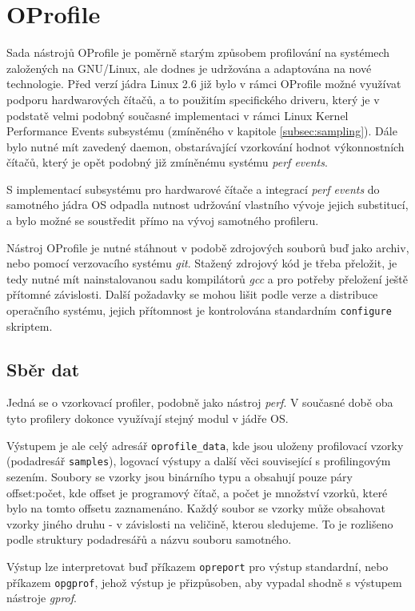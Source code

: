 \documentclass[czech,BP]{thesiskiv}
\begin{document}
\section{OProfile}

Sada nástrojů OProfile je poměrně starým způsobem profilování na systémech založených na GNU/Linux, ale dodnes je udržována a adaptována na nové technologie. Před verzí jádra Linux 2.6 již bylo v rámci OProfile možné využívat podporu hardwarových čítačů, a to použitím specifického driveru, který je v podstatě velmi podobný současné implementaci v rámci Linux Kernel Performance Events subsystému (zmíněného v kapitole \ref{subsec:sampling}). Dále bylo nutné mít zavedený daemon, obstarávající vzorkování hodnot výkonnostních čítačů, který je opět podobný již zmíněnému systému \emph{perf events}.

S implementací subsystému pro hardwarové čítače a integrací \emph{perf events} do samotného jádra OS odpadla nutnost udržování vlastního vývoje jejich substitucí, a bylo možné se soustředit přímo na vývoj samotného profileru.

Nástroj OProfile je nutné stáhnout v podobě zdrojových souborů buď jako archiv, nebo pomocí verzovacího systému \emph{git}. Stažený zdrojový kód je třeba přeložit, je tedy nutné mít nainstalovanou sadu kompilátorů \emph{gcc} a pro potřeby přeložení ještě přítomné závislosti. Další požadavky se mohou lišit podle verze a distribuce operačního systému, jejich přítomnost je kontrolována standardním \texttt{configure} skriptem.

\subsection*{Sběr dat}

Jedná se o vzorkovací profiler, podobně jako nástroj \emph{perf}. V současné době oba tyto profilery dokonce využívají stejný modul v jádře OS.

Výstupem je ale celý adresář \texttt{oprofile\_data}, kde jsou uloženy profilovací vzorky (podadresář \texttt{samples}), logovací výstupy a další věci související s profilingovým sezením. Soubory se vzorky jsou binárního typu a obsahují pouze páry offset:počet, kde offset je programový čítač, a počet je množství vzorků, které bylo na tomto offsetu zaznamenáno. Každý soubor se vzorky může obsahovat vzorky jiného druhu - v závislosti na veličině, kterou sledujeme. To je rozlišeno podle struktury podadresářů a názvu souboru samotného.

Výstup lze interpretovat buď příkazem \texttt{opreport} pro výstup standardní, nebo příkazem \texttt{opgprof}, jehož výstup je přizpůsoben, aby vypadal shodně s výstupem nástroje \emph{gprof}.
\end{document}
